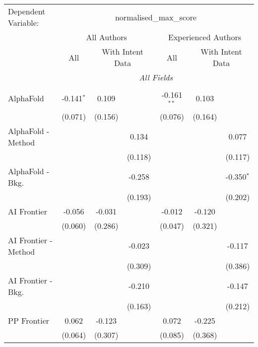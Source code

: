 \begingroup
\centering
\begin{tabular}{lcccccc}
   \tabularnewline \midrule \midrule
   Dependent Variable: & \multicolumn{6}{c}{normalised\_max\_score}\\
 & \multicolumn{3}{c}{All Authors} & \multicolumn{3}{c}{Experienced Authors} \\
\cmidrule(lr){2-4} \cmidrule(lr){5-7}
 & \multicolumn{1}{c}{All} & \multicolumn{2}{c}{With Intent Data} & \multicolumn{1}{c}{All} & \multicolumn{2}{c}{With Intent Data} \\
\cmidrule(lr){2-2} \cmidrule(lr){3-4} \cmidrule(lr){5-5} \cmidrule(lr){6-7}
 & \multicolumn{6}{c}{\textit{All Fields}} \\ \\
   AlphaFold            & -0.141$^{*}$ & 0.109   &         & -0.161$^{**}$ & 0.103   &   \\   
                        & (0.071)      & (0.156) &         & (0.076)       & (0.164) &   \\   
   AlphaFold - Method   &              &         & 0.134   &               &         & 0.077\\   
                        &              &         & (0.118) &               &         & (0.117)\\   
   AlphaFold - Bkg.     &              &         & -0.258  &               &         & -0.350$^{*}$\\   
                        &              &         & (0.193) &               &         & (0.202)\\   
   AI Frontier          & -0.056       & -0.031  &         & -0.012        & -0.120  &   \\   
                        & (0.060)      & (0.286) &         & (0.047)       & (0.321) &   \\   
   AI Frontier - Method &              &         & -0.023  &               &         & -0.117\\   
                        &              &         & (0.309) &               &         & (0.386)\\   
   AI Frontier - Bkg.   &              &         & -0.210  &               &         & -0.147\\   
                        &              &         & (0.163) &               &         & (0.212)\\   
   PP Frontier          & 0.062        & -0.123  &         & 0.072         & -0.225  &   \\   
                        & (0.064)      & (0.307) &         & (0.085)       & (0.368) &   \\   

\end{tabular}
